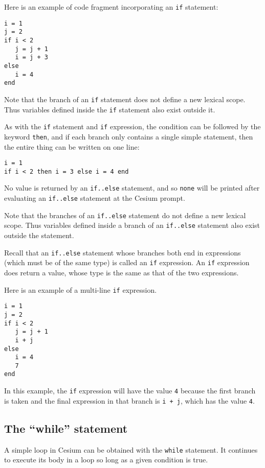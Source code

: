 \documentclass[a4paper,10pt]{article}
\newcommand{\code}{\lstinline}
\begin{document}
{Here is an example of code fragment incorporating an \code{if} statement:

\begin{lstlisting}
i = 1
j = 2
if i < 2
   j = j + 1
   i = j + 3
else
   i = 4
end
\end{lstlisting}

Note that the branch of an \code{if} statement does not define a new lexical scope. Thus
variables defined inside the \code{if} statement also exist outside it.

As with the \code{if} statement and \code{if} expression, the condition can be followed by the keyword
\code{then}, and if each branch only contains a single simple statement, then the entire thing can
be written on one line:

\begin{lstlisting}
i = 1
if i < 2 then i = 3 else i = 4 end
\end{lstlisting}

No value is returned by an \code{if..else} statement, and so \code{none} will be printed after
evaluating an \code{if..else} statement at the Cesium prompt.

Note that the branches of an \code{if..else} statement do not define a new lexical scope. Thus
variables defined inside a branch of an \code{if..else} statement also exist outside the statement.

Recall that an \code{if..else} statement whose branches both end in expressions (which must be of 
the same type) is called an \code{if} expression. An \code{if} expression does return a value, whose 
type is the same as that of the two expressions. 

Here is an example of a multi-line \code{if} expression.

\begin{lstlisting}
i = 1
j = 2
if i < 2
   j = j + 1
   i + j
else
   i = 4
   7
end
\end{lstlisting}

In this example, the \code{if} expression will have the value \code{4} because the first branch is 
taken and the final expression in that branch is \code{i + j}, which has the value \code{4}.

\subsection{The ``while'' statement}

A simple loop in Cesium can be obtained with the \code{while} statement. It continues to execute its
body in a loop so long as a given condition is true.

}
\end{document}
